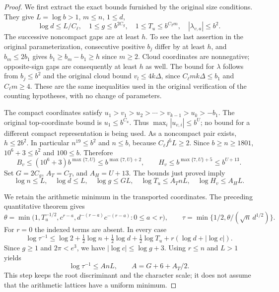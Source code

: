 \begin{proof}
We first extract the exact bounds furnished by the original size
conditions.  They give $L=\log b>1$, $m\leq n$, $1\leq d$,
\begin{equation}\label{global-gram-far-size-extraction}
 \log d\leq L/C_\ell,\quad
 1\leq g\leq b^{2C_g},\quad
 1\leq T_u\leq b^{C_Tm},\quad
 |\lambda_{v,a}|\leq b^2.
\end{equation}
The successive noncompact gaps are at least $h$.  To see the last
assertion in the original parameterization, consecutive positive
$b_j$ differ by at least $h$, and $b_m\leq2b_1$ gives
$b_1\geq b_m-b_1\geq h$ since $m\geq2$.  Cloud coordinates
are nonnegative; opposite-sign gaps are consequently at least $h$
as well.  The bound for $\lambda$ follows from $b_j\leq b^2$
and the original cloud bound $v_l\leq4k\Delta$, since
$C_\ell mk\Delta\leq b_1$ and $C_\ell m\geq4$.
These are the same inequalities used in the original
verification of the counting hypotheses, with no change of parameters.
\cite{global-gram-far-source}

The compact coordinates satisfy
$u_1>v_1>u_2>\cdots>v_{k-1}>u_k>-b_1$.
The original top-coordinate bound is $u_1\leq b^{C_u}$.
Thus $\max_i|u_{v,i}|\leq b^U$; no bound for a different compact
representation is being used.  As a noncompact pair exists,
$h\leq2b^2$.  In particular $n^{19}\leq b^2$ and $n\leq b$,
because $C_\ell f^5L\geq2$.  Since $b\geq n\geq1801$,
$10^6+3\leq b^2$ and $100\leq b$.  Therefore
\[
 B_v\leq(10^6+3)b^{\max\{7,U\}}
       \leq b^{\max\{7,U\}+2},\qquad
 H_v\leq b^{\max\{7,U\}+5}\leq b^{U+13}.
\]
Set $G=2C_g$, $A_T=C_T$, and $A_H=U+13$.  The bounds just proved
imply
\begin{equation}\label{global-gram-far-log-bounds}
 \log n\leq L,\quad \log d\leq L,\quad
 \log g\leq GL,\quad \log T_u\leq A_TnL,\quad
 \log H_v\leq A_HL.
\end{equation}

We retain the arithmetic minimum in the transported coordinates.
The preceding quantitative theorem gives
\[
 \theta=\min\bigl(1,T_u^{-1/2},c^{r-a},
                   d^{-(r-a)}c^{-(r-a)}:0\leq a<r\bigr),
 \qquad \tau=\min\{1/2,\theta/(\sqrt n\,d^{1/2})\}.
\]
For $r=0$ the indexed terms are absent.  In every case
\[
 \log\tau^{-1}
 \leq\log2+\tfrac12\log n+\tfrac12\log d+
       \tfrac12\log T_u+r(\log d+|\log c|).
\]
Since $g\geq1$ and $2\pi<e^3$, we have
$|\log c|\leq\log g+3$.  Using $r\leq n$ and $L>1$ yields
\begin{equation}\label{global-gram-far-tau-log}
 \log\tau^{-1}\leq A nL,
 \qquad A=G+6+A_T/2.
\end{equation}
This step keeps the root discriminant and the character scale; it
does not assume that the arithmetic lattices have a uniform minimum.


\end{proof}
